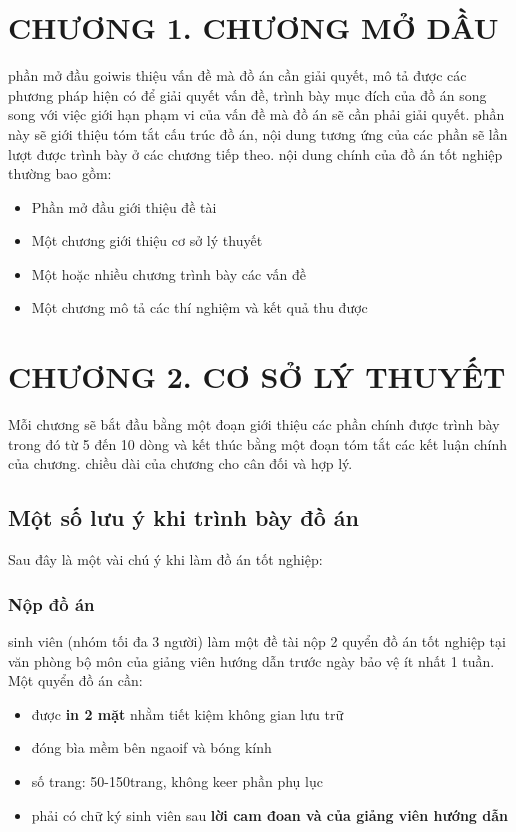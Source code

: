 \documentclass{article}
\begin{document}
\section*{CHƯƠNG 1. CHƯƠNG MỞ DẦU}
{}
\setcounter{subsection}{0}
\setcounter{figure}{0}
\setcounter{table}{0}
phần mở đầu goiwis thiệu vấn đề mà đồ án cần giải quyết, mô tả được các phương pháp hiện có để giải quyết vấn đề, trình bày mục đích của đồ án song song với việc giới hạn phạm vi của vấn đề mà đồ án sẽ cần phải giải quyết. phần này sẽ giới thiệu tóm tắt cấu trúc đồ án, nội dung tương ứng của các phần sẽ lần lượt được trình bày ở các chương tiếp theo.
nội dung chính của đồ án tốt nghiệp thường bao gồm: 
\begin{itemize} %
    \item Phần mở đầu giới thiệu đề tài
    \item Một chương giới thiệu cơ sở lý thuyết
    \item Một hoặc nhiều chương trình bày các vấn đề 
    \item Một chương mô tả các thí nghiệm và kết quả thu được
\end{itemize}
\cleardoublepage
\newpage

\section*{CHƯƠNG 2. CƠ SỞ LÝ THUYẾT}
{}
\setcounter{section}{2}
\setcounter{subsection}{0}
\setcounter{figure}{0}
\setcounter{table}{0}
Mỗi chương sẽ bắt đầu bằng một đoạn giới thiệu các phần chính được trình bày trong đó từ 5 đến 10 dòng và kết thúc bằng một đoạn tóm tắt các kết luận chính của chương. chiều dài của chương cho cân đối và hợp lý.

\subsection{Một số lưu ý khi trình bày đồ án}
Sau đây là một vài chú ý khi làm đồ án tốt nghiệp:
\subsubsection{Nộp đồ án}
sinh viên (nhóm tối đa 3 người) làm một đề tài nộp 2 quyển đồ án tốt nghiệp tại văn phòng bộ môn của giảng viên hướng dẫn trước ngày bảo vệ ít nhất 1 tuần. Một quyển đồ án cần:
\begin{itemize}
    \item được \textbf{in 2 mặt} nhằm tiết kiệm không gian lưu trữ
    \item đóng bìa mềm bên ngaoif và bóng kính
    \item số trang: 50-150trang, không keer phần phụ lục
    \item phải có chữ ký sinh viên sau \textbf{lời cam đoan và của giảng viên hướng dẫn}
\end{itemize}
\end{document}
